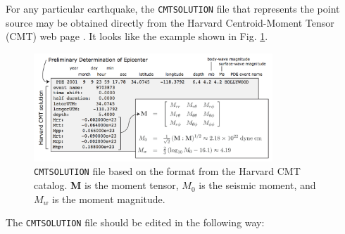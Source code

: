 For any particular earthquake, the \texttt{CMTSOLUTION} file that
represents the point source may be obtained directly from the Harvard
Centroid-Moment Tensor (CMT) web page .
It looks like the example shown in Fig. \ref{fig:CMTSOLUTION-file}.
\begin{figure}[htp]
\begin{centering}
\includegraphics[width=0.8\textwidth]{figures/Hollywood_CMT.jpg}
\par
\end{centering}
\caption{\texttt{CMTSOLUTION} file based on the
format from the Harvard CMT catalog. \textbf{M} is the moment tensor,
$M_{0}${\small {} }is the seismic moment, and $M_{w}$ is the moment
magnitude.}
\label{fig:CMTSOLUTION-file}
\end{figure}
%
The \texttt{CMTSOLUTION} file should be edited in the following way:
